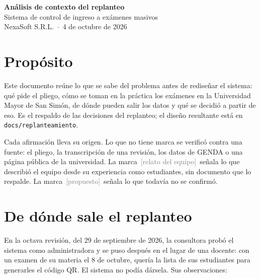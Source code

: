 \documentclass[11pt,letterpaper]{article}
\newcommand{\relatado}{\textcolor{gray}{\footnotesize\,[relato del equipo]}}
\newcommand{\propuesto}{\textcolor{gray}{\footnotesize\,[propuesto]}}
\begin{document}
\begin{center}
{\Large\bfseries Análisis de contexto del replanteo}\\[4pt]
{\large Sistema de control de ingreso a exámenes masivos}\\[6pt]
{\small NexaSoft S.R.L. \,$\cdot$\, 4 de octubre de 2026}
\end{center}

\section{Propósito}

Este documento reúne lo que se sabe del problema antes de rediseñar el sistema: qué pide
el pliego, cómo se toman en la práctica los exámenes en la Universidad Mayor de San Simón,
de dónde pueden salir los datos y qué se decidió a partir de eso. Es el respaldo de las
decisiones del replanteo; el diseño resultante está en \texttt{docs/replanteamiento}.

Cada afirmación lleva su origen. Lo que no tiene marca se verificó contra una fuente: el
pliego, la transcripción de una revisión, los datos de GENDA o una página pública de la
universidad. La marca \relatado\ señala lo que describió el equipo desde su experiencia
como estudiantes, sin documento que lo respalde. La marca \propuesto\ señala lo que
todavía no se confirmó.

\section{De dónde sale el replanteo}

En la octava revisión, del 29 de septiembre de 2026, la consultora probó el sistema como
administradora y se puso después en el lugar de una docente: con un examen de su materia
el 8 de octubre, quería la lista de sus estudiantes para generarles el código QR. El
sistema no podía dársela. Sus observaciones:
\end{document}
